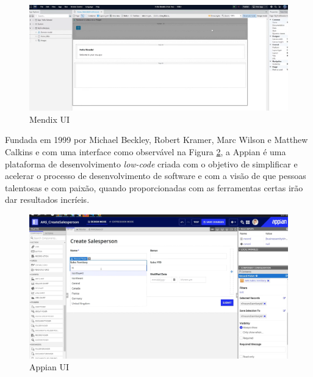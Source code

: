         \begin{figure}[htbp] %
            \centering
            \includegraphics[width=\textwidth]{imgs/MendixUI.png}
            \caption{Mendix UI}\label{fig:mendixui-ui}
        \end{figure}


    \label{secsec:appian}

        Fundada em 1999 por Michael Beckley, Robert Kramer, Marc Wilson e Matthew Calkins e com uma interface como observável na Figura \ref{fig:appian-ui}, a Appian é uma plataforma de desenvolvimento \textit{low-code} criada com o objetivo de simplificar e acelerar o processo de desenvolvimento de software e com a visão de que pessoas talentosas e com paixão, quando proporcionadas com as ferramentas certas irão dar resultados incríeis\cite{appian-company-history,appian-company-overview}. 
    
        \begin{figure}[htbp] %
            \centering
            \includegraphics[width=\textwidth]{imgs/AppianUI.png}
            \caption{Appian UI}\label{fig:appian-ui}
        \end{figure}

